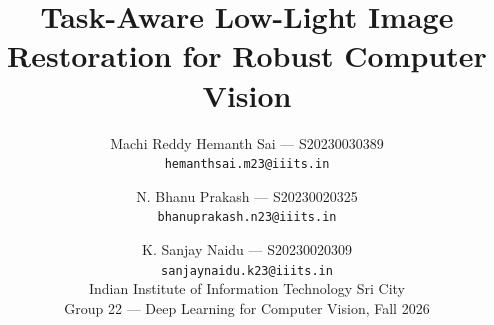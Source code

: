 \documentclass[10pt,twocolumn,letterpaper]{article}
\title{Task-Aware Low-Light Image Restoration for Robust Computer Vision}
\author{Machi Reddy Hemanth Sai --- S20230030389\\
{\tt\small hemanthsai.m23@iiits.in}
\and
N. Bhanu Prakash --- S20230020325\\
{\tt\small bhanuprakash.n23@iiits.in}
\and
K. Sanjay Naidu --- S20230020309\\
{\tt\small sanjaynaidu.k23@iiits.in}\\
Indian Institute of Information Technology Sri City\\
{\small Group 22 --- Deep Learning for Computer Vision, Fall 2026}
}
\begin{document}
\maketitle
    


{
    \small
    
    
}

% 
\end{document}
